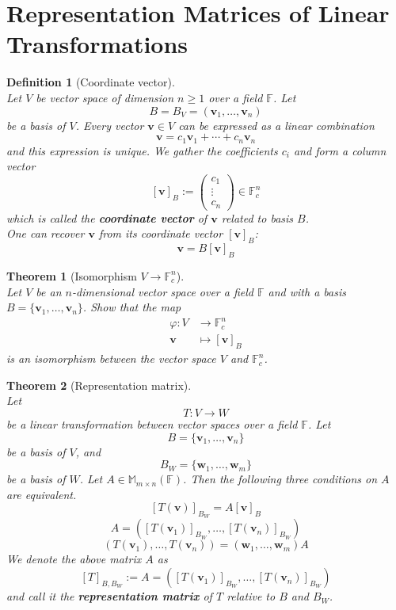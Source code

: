 \documentclass[12pt]{article}
\newtheorem{definition}{Definition}[section]
\newtheorem{theorem}{Theorem}[section]
\theoremstyle{definition}
\begin{document}
\section{Representation Matrices of Linear Transformations}
\begin{definition}[Coordinate vector]
\hfill\\\normalfont Let $V$ be vector space of dimension $n\geq 1$ over a field $\mathbb{F}$. Let
\[
B=B_V=(\mathbf{v}_1,\ldots,\mathbf{v}_n)
\]
be a basis of $V$. Every vector $\mathbf{v}\in V$ can be expressed as a linear combination
\[
\mathbf{v}=c_1\mathbf{v}_1+\cdots+c_n\mathbf{v}_n
\]
and this expression is unique. We gather the coefficients $c_i$ and form a column vector
\[
[\mathbf{v}]_B:=\begin{pmatrix}c_1\\\vdots\\c_n\end{pmatrix}\in\mathbb{F}_c^n
\]
which is called the \textbf{coordinate vector} of $\mathbf{v}$ related to basis $B$.\\
One can recover $\mathbf{v}$ from its coordinate vector $[\mathbf{v}]_B$:
\[
\mathbf{v}=B[\mathbf{v}]_B
\]
\end{definition}
\begin{theorem}[Isomorphism $V\to \mathbb{F}_c^n$]
\hfill\\\normalfont Let $V$ be an $n$-dimensional vector space over a field $\mathbb{F}$ and with a basis $B=\{\mathbf{v}_1,\ldots,\mathbf{v}_n\}$. Show that the map
\[
\begin{aligned}
\varphi:V&\to\mathbb{F}_c^n\\
\mathbf{v}&\mapsto[\mathbf{v}]_B
\end{aligned}
\]
is an isomorphism between the vector space $V$ and $\mathbb{F}_c^n$.
\end{theorem}
\begin{theorem}[Representation matrix]
\hfill\\\normalfont Let 
\[
T:V\to W
\]
be a linear transformation between vector spaces over a field $\mathbb{F}$. Let
\[
B=\{\mathbf{v}_1,\ldots,\mathbf{v}_n\}
\]
be a basis of $V$, and
\[
B_W=\{\mathbf{w}_1,\ldots,\mathbf{w}_m\}
\]
be a basis of $W$. Let $A\in \mathbb{M}_{m\times n}(\mathbb{F})$. Then the following three conditions on $A$ are equivalent. 
\[
[T(\mathbf{v})]_{B_W}=A[\mathbf{v}]_B
\]
\[
A=([T(\mathbf{v}_1)]_{B_W},\ldots,[T(\mathbf{v}_n)]_{B_W})
\]
\[
(T(\mathbf{v}_1),\ldots,T(\mathbf{v}_n))=(\mathbf{w}_1,\ldots,\mathbf{w}_m)A
\]
We denote the above matrix $A$ as
\[
[T]_{B,B_W}:=A=([T(\mathbf{v}_1)]_{B_W},\ldots,[T(\mathbf{v}_n)]_{B_W})
\]
and call it the \textbf{representation matrix} of $T$ relative to $B$ and $B_W$.
\end{theorem}
\end{document}
